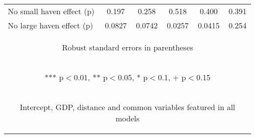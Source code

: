 \begin{center}
\begin{tabular}{lccccc}
No small haven effect (p) & 0.197 & 0.258 & 0.518 & 0.400 & 0.391 \\
 No large haven effect (p) & 0.0827 & 0.0742 & 0.0257 & 0.0415 & 0.254 \\ \hline
\multicolumn{6}{c}{\begin{footnotesize} Robust standard errors in parentheses\end{footnotesize}} \\
\multicolumn{6}{c}{\begin{footnotesize} *** p$<$0.01, ** p$<$0.05, * p$<$0.1, + p$<$0.15\end{footnotesize}} \\
\multicolumn{6}{c}{\begin{footnotesize} Intercept, GDP, distance and common variables featured in all models\end{footnotesize}} \\
\end{tabular}
\end{center}
